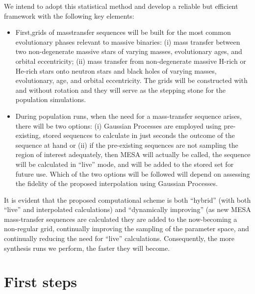 \documentclass[preprint]{aastex}
\begin{document}
    
We intend to adopt this statistical method and develop a reliable but efficient framework with the following key elements:
\begin{itemize}
\item First,grids of mass{\textendash}transfer sequences will be built for the most common evolutionary phases relevant to massive binaries: (i) mass transfer between two non-degenerate massive stars of varying masses, evolutionary ages, and orbital eccentricity; (ii) mass transfer from non-degenerate massive H-rich or He-rich stars onto neutron stars and black holes of varying masses, evolutionary, age, and orbital eccentricity. The grids will be constructed with and without rotation and they will serve as the stepping stone for the population simulations.
\item During population runs, when the need for a mass-transfer sequence arises, there will be two options: (i) Gaussian Processes are employed using pre-existing, stored sequences to calculate in just seconds the outcome of the sequence at hand or (ii) if the pre-existing sequences are not sampling the region of interest adequately, then MESA will actually be called, the sequence will be calculated in {\textquotedblleft}live{\textquotedblright} mode, and will be added to the stored set for future use. Which of the two options will be followed will depend on assessing the fidelity of the proposed interpolation using Gaussian Processes.
\end{itemize}

It is evident that the proposed computational scheme is both {\textquotedblleft}hybrid{\textquotedblright} (with both {\textquotedblleft}live{\textquotedblright} and interpolated calculations) and {\textquotedblleft}dynamically improving{\textquotedblright} (as new MESA mass-transfer sequences are calculated they are added to the now-becoming a non-regular grid, continually improving the sampling of the parameter space, and continually reducing the need for {\textquotedblleft}live{\textquotedblright} calculations. Consequently, the more synthesis runs we perform, the faster they will become.
    
    
    
    
    
    
    
    

\section{First steps}
    
\end{document}
